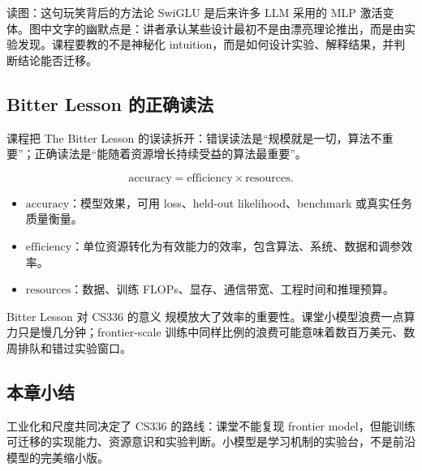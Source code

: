 \begin{knowledgebox}{读图：这句玩笑背后的方法论}
SwiGLU 是后来许多 LLM 采用的 MLP 激活变体。图中文字的幽默点是：讲者承认某些设计最初不是由漂亮理论推出，而是由实验发现。课程要教的不是神秘化 intuition，而是如何设计实验、解释结果，并判断结论能否迁移。
\end{knowledgebox}

\subsection{Bitter Lesson 的正确读法}

课程把 The Bitter Lesson 的误读拆开：错误读法是“规模就是一切，算法不重要”；正确读法是“能随着资源增长持续受益的算法最重要”。

\[
\text{accuracy} = \text{efficiency} \times \text{resources}.
\]

\begin{itemize}
    \item \(\text{accuracy}\)：模型效果，可用 loss、held-out likelihood、benchmark 或真实任务质量衡量。
    \item \(\text{efficiency}\)：单位资源转化为有效能力的效率，包含算法、系统、数据和调参效率。
    \item \(\text{resources}\)：数据、训练 FLOPs、显存、通信带宽、工程时间和推理预算。
\end{itemize}

\begin{importantbox}{Bitter Lesson 对 CS336 的意义}
规模放大了效率的重要性。课堂小模型浪费一点算力只是慢几分钟；frontier-scale 训练中同样比例的浪费可能意味着数百万美元、数周排队和错过实验窗口。
\end{importantbox}

\subsection{本章小结}

工业化和尺度共同决定了 CS336 的路线：课堂不能复现 frontier model，但能训练可迁移的实现能力、资源意识和实验判断。小模型是学习机制的实验台，不是前沿模型的完美缩小版。

